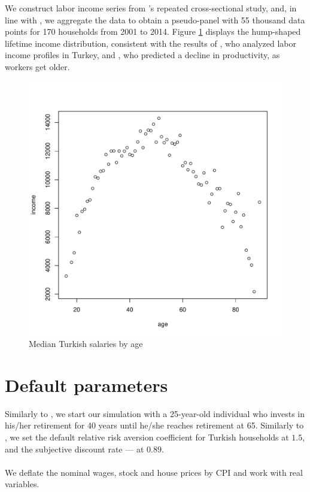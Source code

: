 We construct labor income series from \citet{tuik}'s repeated cross-sectional study, and, in line with \citet{aktug}, we aggregate the data to obtain a pseudo-panel with 55 thousand data points for 170 households from 2001 to 2014. Figure \ref{fig:tuik} displays the hump-shaped lifetime income distribution, consistent with the results of \citet{aktug}, who analyzed labor income profiles in Turkey, and \citet{benporath}, who predicted a decline in productivity, as workers get older.

\begin{figure}[h!]
	\centering
	\includegraphics[scale=0.4]{figs/wage2median.pdf}
	\caption{Median Turkish salaries by age}
	\label{fig:tuik}
\end{figure}

\section{Default parameters}
Similarly to \citet{munk}, we start our simulation with a 25-year-old individual who invests in his/her retirement for 40 years until he/she reaches retirement at 65. Similarly to \citet{torul}, we set the default relative risk aversion coefficient for Turkish households at $1.5$, and the subjective discount rate --- at $0.89$.

\paragraph{}We deflate the nominal wages, stock and house prices by CPI and work with real variables.

